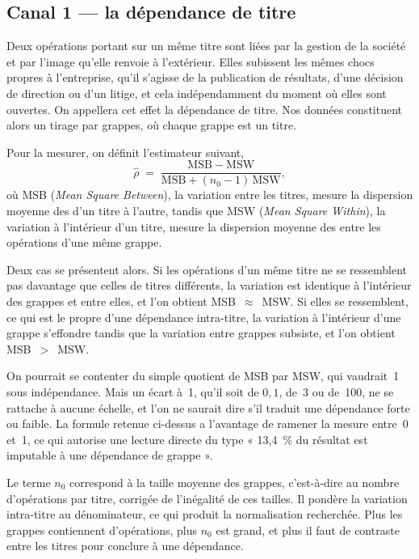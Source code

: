 \subsection{Canal 1 --- la dépendance de titre}
\label{sec:dep-canal1}

Deux opérations portant sur un même titre sont liées par la gestion de la
société et par l'image qu'elle renvoie à l'extérieur. Elles subissent les
mêmes chocs propres à l'entreprise, qu'il s'agisse de la publication de
résultats, d'une décision de direction ou d'un litige, et cela indépendamment
du moment où elles sont ouvertes. On appellera cet effet la dépendance de
titre. Nos données constituent alors un tirage par grappes, où chaque grappe
est un titre.

Pour la mesurer, on définit l'estimateur suivant,
\[
  \hat\rho \;=\; \frac{\mathrm{MSB}-\mathrm{MSW}}
                      {\mathrm{MSB} + (n_0 - 1)\,\mathrm{MSW}},
\]
où MSB (\emph{Mean Square Between}), la variation entre les titres, mesure la
dispersion moyenne des \edgevar{} d'un titre à l'autre, tandis que MSW
(\emph{Mean Square Within}), la variation à l'intérieur d'un titre, mesure la
dispersion moyenne des \edgevar{} entre les opérations d'une même grappe.

Deux cas se présentent alors. Si les opérations d'un même titre ne se
ressemblent pas davantage que celles de titres différents, la variation est
identique à l'intérieur des grappes et entre elles, et l'on obtient
MSB~$\approx$~MSW. Si elles se ressemblent, ce qui est le propre d'une
dépendance intra-titre, la variation à l'intérieur d'une grappe s'effondre
tandis que la variation entre grappes subsiste, et l'on obtient
MSB~$>$~MSW.

On pourrait se contenter du simple quotient de MSB par MSW, qui vaudrait~1
sous indépendance. Mais un écart à~1, qu'il soit de $0{,}1$, de~3 ou de~100,
ne se rattache à aucune échelle, et l'on ne saurait dire s'il traduit une
dépendance forte ou faible. La formule retenue ci-dessus a l'avantage de
ramener la mesure entre~0 et~1, ce qui autorise une lecture directe du type
« 13,4~\% du résultat est imputable à une dépendance de grappe ».

Le terme $n_0$ correspond à la taille moyenne des grappes, c'est-à-dire au
nombre d'opérations par titre, corrigée de l'inégalité de ces tailles. Il
pondère la variation intra-titre au dénominateur, ce qui produit la
normalisation recherchée. Plus les grappes contiennent d'opérations, plus
$n_0$ est grand, et plus il faut de contraste entre les titres pour conclure
à une dépendance.

